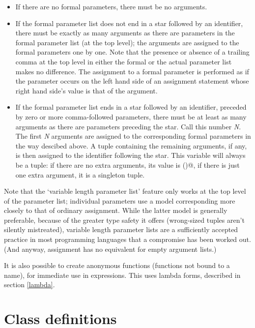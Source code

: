 \begin{itemize}

\item
If there are no formal parameters, there must be no arguments.

\item
If the formal parameter list does not end in a star followed by an
identifier, there must be exactly as many arguments as there are
parameters in the formal parameter list (at the top level); the
arguments are assigned to the formal parameters one by one.  Note that
the presence or absence of a trailing comma at the top level in either
the formal or the actual parameter list makes no difference.  The
assignment to a formal parameter is performed as if the parameter
occurs on the left hand side of an assignment statement whose right
hand side's value is that of the argument.

\item
If the formal parameter list ends in a star followed by an identifier,
preceded by zero or more comma-followed parameters, there must be at
least as many arguments as there are parameters preceding the star.
Call this number {\em N}.  The first {\em N} arguments are assigned to
the corresponding formal parameters in the way descibed above.  A
tuple containing the remaining arguments, if any, is then assigned to
the identifier following the star.  This variable will always be a
tuple: if there are no extra arguments, its value is \verb@()@, if
there is just one extra argument, it is a singleton tuple.

\end{itemize}

Note that the `variable length parameter list' feature only works at
the top level of the parameter list; individual parameters use a model
corresponding more closely to that of ordinary assignment.  While the
latter model is generally preferable, because of the greater type
safety it offers (wrong-sized tuples aren't silently mistreated),
variable length parameter lists are a sufficiently accepted practice
in most programming languages that a compromise has been worked out.
(And anyway, assignment has no equivalent for empty argument lists.)

It is also possible to create anonymous functions (functions not bound
to a name), for immediate use in expressions.  This uses lambda forms,
described in section \ref{lambda}.

\section{Class definitions} \label{class}

